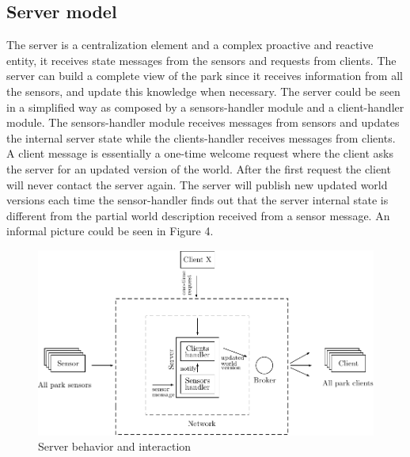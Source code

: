 \documentclass[11pt]{article}
\begin{document}
\subsection{Server model}
The server is a centralization element and a complex proactive and reactive entity, it receives state messages from the sensors and requests from clients. The server can build a complete view of the park since it receives information from all the sensors, and update this knowledge when necessary. The server could be seen in a simplified way as composed by a sensors-handler module and a client-handler module. The sensors-handler module receives messages from sensors and updates the internal server state while the clients-handler receives messages from clients. A client message is essentially a one-time welcome request where the client asks the server for an updated version of the world. After the first request the client will never contact the server again. The server will publish new updated world versions each time the sensor-handler finds out that the server internal state is different from the partial world description received from a sensor message. An informal picture could be seen in Figure 4.
\begin{figure}
  \centering
	\includegraphics[scale=1]{server}
  \caption{Server behavior and interaction}
\end{figure}
\end{document}
